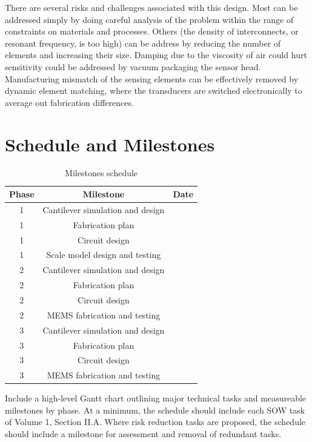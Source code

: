 There are several risks and challenges associated with this design. Most can be addressed simply by doing careful analysis of the problem within the range of constraints on materials and processes. Others (the density of interconnects, or resonant frequency, is too high) can be address by reducing the number of elements and increasing their size. Damping due to the viscosity of air could hurt sensitivity could be addressed by vacuum packaging the sensor head. Manufacturing mismatch of the sensing elements can be effectively removed by dynamic element matching, where the transducers are switched electronically to average out fabrication differences.

\section{Schedule and Milestones}

\begin{table}[h!]
\centering
  \begin{tabular}{|c||c|c|}
    \hline
    Phase & Milestone & Date\\
    \hline
    \hline
    1 & Cantilever simulation and design & \\
    \hline
    1 & Fabrication plan & \\
    \hline
    1 & Circuit design & \\
    \hline
    1 & Scale model design and testing & \\
    \hline
    \hline
    2 & Cantilever simulation and design & \\
    \hline
    2 & Fabrication plan & \\
    \hline
    2 & Circuit design & \\
    \hline
    2 & MEMS fabrication and testing & \\
    \hline
    \hline
    3 & Cantilever simulation and design & \\
    \hline
    3 & Fabrication plan & \\
    \hline
    3 & Circuit design & \\
    \hline
    3 & MEMS fabrication and testing & \\
    \hline
  \end{tabular}
\caption{Milestones schedule}
\label{table:sched}
\end{table}

Include a high-level Gantt chart outlining major technical tasks and measureable milestones
by phase. At a minimum, the schedule should include each SOW task of Volume 1, Section
II.A. Where risk reduction tasks are proposed, the schedule should include a milestone for
assessment and removal of redundant tasks.

